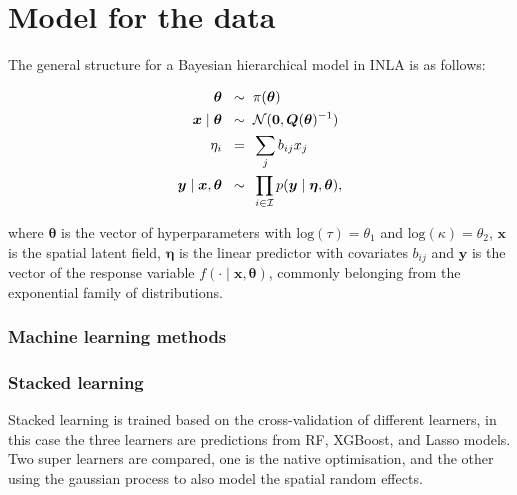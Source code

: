 \documentclass{article}
\begin{document}
\section{Model for the data}

The general structure for a Bayesian hierarchical model in INLA is as follows:


\begin{align}
\boldsymbol{\theta} \hspace{2mm} \sim & \hspace{2mm} \pi(\boldsymbol{\theta}) \label{eqn:eq5}\\
\boldsymbol{x} \mid \boldsymbol{\theta} \hspace{2mm} \sim & \hspace{2mm} \mathcal{N}(\boldsymbol{0}, \boldsymbol{Q}(\boldsymbol{\theta})^{-1}) \label{eqn:eq6}\\
\eta_{i} \hspace{2mm} = & \hspace{2mm} \sum_{j}b_{ij}x_{j}\label{eqn:eq7}\\
\boldsymbol{y} \mid \boldsymbol{x}, \boldsymbol{\theta} \hspace{2mm} \sim & \hspace{2mm} \prod_{i \in \mathcal{I}}p(\boldsymbol{y} \mid \boldsymbol{\eta}, \boldsymbol{\theta}) \label{eqn:eq8},
\end{align}

where $\boldsymbol{\theta}$ is the vector of hyperparameters with $\text{log}(\tau) = \theta_{1}$ and $\text{log}(\kappa) = \theta_{2}$,  $\boldsymbol{x}$ is the spatial latent field, $\boldsymbol{\eta}$ is the linear predictor with covariates $b_{ij}$ and $\boldsymbol{y}$ is the vector of the response variable $f(\cdot \mid \boldsymbol{x}, \boldsymbol{\theta})$, commonly belonging from the exponential family of distributions. 
\vspace{0.2cm}



\subsubsection{Machine learning methods}

\subsubsection{Stacked learning}
Stacked learning is trained based on the cross-validation of different learners, in this case the three learners are predictions from RF, XGBoost, and Lasso models. Two super learners are compared, one is the native optimisation, and the other using the gaussian process to also model the spatial random effects. 
\end{document}
